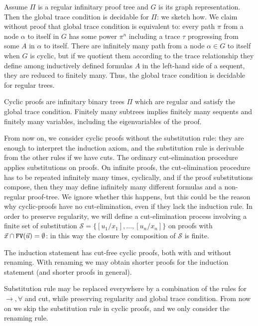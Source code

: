 \documentclass[a4paper,12pt]{article}
\newcommand{\setS}              { {\mathcal S} }
\newcommand{\FV}              { {\tt FV} }
\begin{document}
Assume $\Pi$ is a regular infinitary proof tree and $G$ is its graph representation. Then the global trace condition is decidable for $\Pi$: we sketch how.  We claim without proof that global trace condition is equivalent to:  every path $\pi$ from a node $\alpha$ to itself in $G$ has some power $\pi^n$ including a trace $\tau$ progressing from some $A$ in $\alpha$ to itself. There are infinitely many path from a node $\alpha \in G$ to itself when $G$ is cyclic, but if we quotient them according to the trace relationship they define among inductively defined formulas $A$ in the left-hand side of a sequent, they are reduced to finitely many. 
Thus, the global trace condition is decidable for regular trees.

Cyclic proofs are infinitary binary trees $\Pi$ which are regular and satisfy the global trace condition. Finitely many subtrees implies finitely many sequents and finitely many variables, including the eigenvariables of the proof.

From now on, we consider cyclic proofs without the substitution rule: they are enough to interpret the induction axiom, and the substitution rule is derivable from the other rules if we have cuts. The ordinary cut-elimination procedure applies substitutions on proofs. On infinite proofs, the cut-elimination procedure has to be repeated infinitely many times, cyclically, and if the proof substitutions compose, then they may define infinitely many different formulas and a non-regular proof-tree. We ignore whether this happens, but this could be the reason why cyclic-proofs have no cut-elimination, even if they lack the induction rule. In order to preserve regularity, we will  define a cut-elimination process involving a finite set of substitution $\setS = \{[u_1/x_1], \ldots, [u_n/x_n]\}$ on proofs with $\vec{x} \cap \FV(\vec{u}) = \emptyset$: in this way the closure by composition of $\setS$ is finite. 

The induction statement has cut-free cyclic proofs, both with and without renaming. With renaming we may obtain shorter proofs for the induction statement (and shorter proofs  in general).


Substitution rule may be replaced everywhere by a combination of the rules for $\rightarrow, \forall$ and cut, while preserving regularity and global trace condition. From now on we skip the substitution rule in cyclic proofs, and we only consider the renaming rule.
\end{document}
